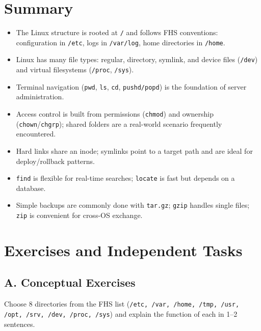 \section{Summary}
\label{sec:summary-filesystem}

\begin{itemize}
    \item The Linux structure is rooted at \texttt{/} and follows FHS conventions: configuration in \texttt{/etc}, logs in \texttt{/var/log}, home directories in \texttt{/home}.
    \item Linux has many file types: regular, directory, symlink, and device files (\texttt{/dev}) and virtual filesystems (\texttt{/proc}, \texttt{/sys}).
    \item Terminal navigation (\texttt{pwd}, \texttt{ls}, \texttt{cd}, \texttt{pushd/popd}) is the foundation of server administration.
    \item Access control is built from permissions (\texttt{chmod}) and ownership (\texttt{chown}/\texttt{chgrp}); shared folders are a real-world scenario frequently encountered.
    \item Hard links share an inode; symlinks point to a target path and are ideal for deploy/rollback patterns.
    \item \texttt{find} is flexible for real-time searches; \texttt{locate} is fast but depends on a database.
    \item Simple backups are commonly done with \texttt{tar.gz}; \texttt{gzip} handles single files; \texttt{zip} is convenient for cross-OS exchange.
\end{itemize}

\section{Exercises and Independent Tasks}
\label{sec:exercises-filesystem}

\subsection*{A. Conceptual Exercises}
\begin{exercisebox}[4.A]
Choose 8 directories from the FHS list (\texttt{/etc, /var, /home, /tmp, /usr,
/opt, /srv, /dev, /proc, /sys}) and explain the function of each in 1--2
sentences.
\end{exercisebox}

